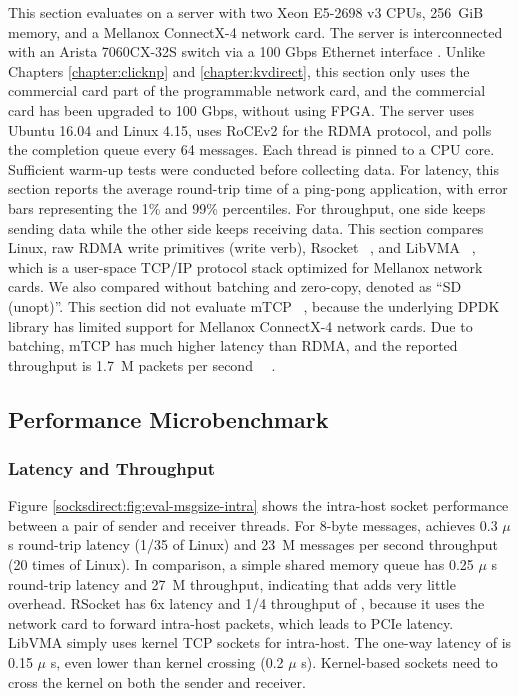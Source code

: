 This section evaluates \sys{} on a server with two Xeon E5-2698 v3 CPUs, 256~GiB memory, and a Mellanox ConnectX-4 network card. The server is interconnected with an Arista 7060CX-32S switch via a 100 Gbps Ethernet interface \cite {arista-7060cx}. Unlike Chapters \ref{chapter:clicknp} and \ref{chapter:kvdirect}, this section only uses the commercial card part of the programmable network card, and the commercial card has been upgraded to 100 Gbps, without using FPGA. The server uses Ubuntu 16.04 and Linux 4.15, uses RoCEv2 for the RDMA protocol, and polls the completion queue every 64 messages.
Each thread is pinned to a CPU core. Sufficient warm-up tests were conducted before collecting data.
For latency, this section reports the average round-trip time of a ping-pong application, with error bars representing the 1\% and 99\% percentiles.
For throughput, one side keeps sending data while the other side keeps receiving data.
This section compares Linux, raw RDMA write primitives (write verb), Rsocket~ \cite {rsockets}, and LibVMA~ \cite {libvma}, which is a user-space TCP/IP protocol stack optimized for Mellanox network cards.
We also compared \sys{} without batching and zero-copy, denoted as ``SD (unopt)''.
This section did not evaluate mTCP~ \cite {jeong2014mtcp}, because the underlying DPDK library has limited support for Mellanox ConnectX-4 network cards. Due to batching, mTCP has much higher latency than RDMA, and the reported throughput is 1.7~M packets per second~~ \cite {kalia2018datacenter}.

\subsection{Performance Microbenchmark}
\label{socksdirect:subsec:microbenchmark}

\subsubsection{Latency and Throughput}

Figure \ref {socksdirect:fig:eval-msgsize-intra} shows the intra-host socket performance between a pair of sender and receiver threads.
For 8-byte messages, \sys achieves 0.3 $ \mu $ s round-trip latency (1/35 of Linux) and 23~M messages per second throughput (20 times of Linux).
In comparison, a simple shared memory queue has 0.25 $ \mu $ s round-trip latency and 27~M throughput, indicating that \sys adds very little overhead.
RSocket has 6x latency and 1/4 throughput of \sys  {}, because it uses the network card to forward intra-host packets, which leads to PCIe latency.
LibVMA simply uses kernel TCP sockets for intra-host.
The one-way latency of \sys  {} is 0.15 $ \mu $ s, even lower than kernel crossing (0.2 $ \mu $ s). Kernel-based sockets need to cross the kernel on both the sender and receiver.

